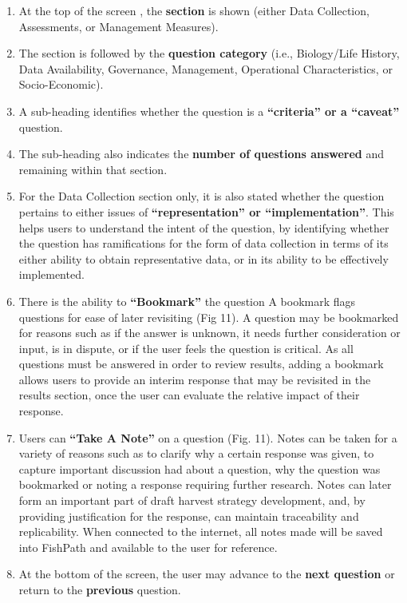 \documentclass[11pt,]{book}
\providecommand{\tightlist}{%
  \setlength{\itemsep}{0pt}\setlength{\parskip}{0pt}}
\begin{document}
\begin{enumerate}
\def\labelenumi{\arabic{enumi}.}
\tightlist
\item
  At the top of the screen , the \textbf{section} is shown (either Data
  Collection, Assessments, or Management Measures).
\item
  The section is followed by the \textbf{question category} (i.e.,
  Biology/Life History, Data Availability, Governance, Management,
  Operational Characteristics, or Socio-Economic).
\item
  A sub-heading identifies whether the question is a
  \textbf{``criteria'' or a ``caveat''} question.
\item
  The sub-heading also indicates the \textbf{number of questions
  answered} and remaining within that section.
\item
  For the Data Collection section only, it is also stated whether the
  question pertains to either issues of \textbf{``representation'' or
  ``implementation''}. This helps users to understand the intent of the
  question, by identifying whether the question has ramifications for
  the form of data collection in terms of its either ability to obtain
  representative data, or in its ability to be effectively implemented.
\item
  There is the ability to \textbf{``Bookmark''} the question A bookmark
  flags questions for ease of later revisiting (Fig 11). A question may
  be bookmarked for reasons such as if the answer is unknown, it needs
  further consideration or input, is in dispute, or if the user feels
  the question is critical. As all questions must be answered in order
  to review results, adding a bookmark allows users to provide an
  interim response that may be revisited in the results section, once
  the user can evaluate the relative impact of their response.
\item
  Users can \textbf{``Take A Note''} on a question (Fig. 11). Notes can
  be taken for a variety of reasons such as to clarify why a certain
  response was given, to capture important discussion had about a
  question, why the question was bookmarked or noting a response
  requiring further research. Notes can later form an important part of
  draft harvest strategy development, and, by providing justification
  for the response, can maintain traceability and replicability. When
  connected to the internet, all notes made will be saved into FishPath
  and available to the user for reference.
\item
  At the bottom of the screen, the user may advance to the \textbf{next
  question} or return to the \textbf{previous} question.
\end{enumerate}
\end{document}
